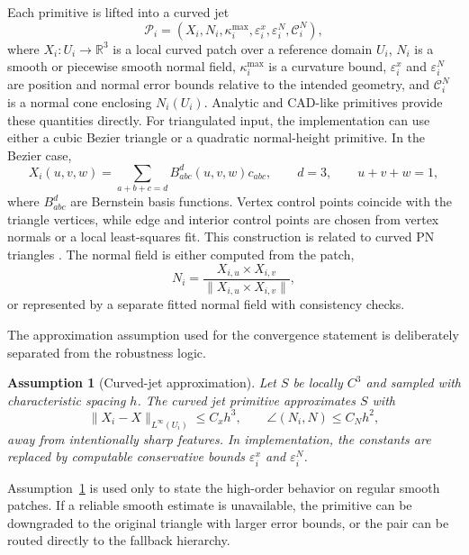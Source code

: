 \documentclass[preprint,12pt]{elsarticle}
\newtheorem{assumption}{Assumption}
\newcommand{\R}{\mathbb{R}}
\newcommand{\Cc}{\mathcal{C}}
\newcommand{\Pc}{\mathcal{P}}
\newcommand{\eps}{\varepsilon}
\begin{document}
Each primitive is lifted into a curved jet
\begin{equation}
    \Pc_i=\left(X_i,N_i,\kappa_i^{\max},\eps_i^x,\eps_i^N,\Cc_i^N\right),
    \label{eq:curved_jet}
\end{equation}
where $X_i:U_i\rightarrow\R^3$ is a local curved patch over a reference domain $U_i$, $N_i$ is a smooth or piecewise smooth normal field, $\kappa_i^{\max}$ is a curvature bound, $\eps_i^x$ and $\eps_i^N$ are position and normal error bounds relative to the intended geometry, and $\Cc_i^N$ is a normal cone enclosing $N_i(U_i)$. Analytic and CAD-like primitives provide these quantities directly. For triangulated input, the implementation can use either a cubic Bezier triangle or a quadratic normal-height primitive. In the Bezier case,
\begin{equation}
    X_i(u,v,w)=\sum_{a+b+c=d}B_{abc}^{d}(u,v,w)c_{abc},
    \qquad d=3,
    \qquad u+v+w=1,
    \label{eq:bezier_patch}
\end{equation}
where $B_{abc}^{d}$ are Bernstein basis functions. Vertex control points coincide with the triangle vertices, while edge and interior control points are chosen from vertex normals or a local least-squares fit. This construction is related to curved PN triangles \cite{vlachos2001pn}. The normal field is either computed from the patch,
\begin{equation}
    N_i=\frac{X_{i,u}\times X_{i,v}}{\|X_{i,u}\times X_{i,v}\|},
\end{equation}
or represented by a separate fitted normal field with consistency checks.

The approximation assumption used for the convergence statement is deliberately separated from the robustness logic.
\begin{assumption}[Curved-jet approximation]
\label{assump:jet_accuracy}
Let $S$ be locally $C^3$ and sampled with characteristic spacing $h$. The curved jet primitive approximates $S$ with
\begin{equation}
    \|X_i-X\|_{L^\infty(U_i)}\le C_x h^3,
    \qquad
    \angle(N_i,N)\le C_N h^2,
    \label{eq:jet_accuracy}
\end{equation}
away from intentionally sharp features. In implementation, the constants are replaced by computable conservative bounds $\eps_i^x$ and $\eps_i^N$.
\end{assumption}

Assumption~\ref{assump:jet_accuracy} is used only to state the high-order behavior on regular smooth patches. If a reliable smooth estimate is unavailable, the primitive can be downgraded to the original triangle with larger error bounds, or the pair can be routed directly to the fallback hierarchy.
\end{document}
